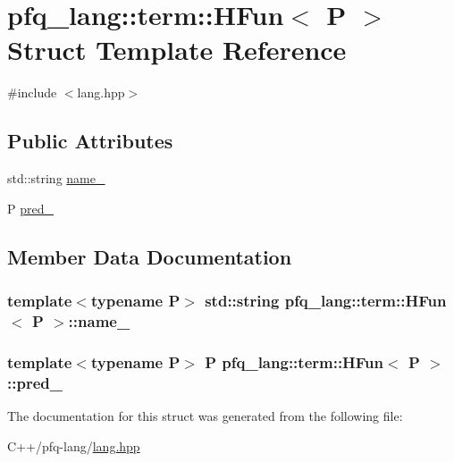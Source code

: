 \hypertarget{structpfq__lang_1_1term_1_1HFun}{\section{pfq\+\_\+lang\+:\+:term\+:\+:H\+Fun$<$ P $>$ Struct Template Reference}
\label{structpfq__lang_1_1term_1_1HFun}
}


{\ttfamily \#include $<$lang.\+hpp$>$}

\subsection*{Public Attributes}
\begin{DoxyCompactItemize}
\item 
std\+::string \hyperlink{structpfq__lang_1_1term_1_1HFun_ae20ef1dda67f36ac1d73bde9eb7ffece}{name\+\_\+}
\item 
P \hyperlink{structpfq__lang_1_1term_1_1HFun_a21b242e11fd7818e6e7c1242433951db}{pred\+\_\+}
\end{DoxyCompactItemize}


\subsection{Member Data Documentation}
\hypertarget{structpfq__lang_1_1term_1_1HFun_ae20ef1dda67f36ac1d73bde9eb7ffece}{
\subsubsection[{name\+\_\+}]{\setlength{\rightskip}{0pt plus 5cm}template$<$typename P$>$ std\+::string {\bf pfq\+\_\+lang\+::term\+::\+H\+Fun}$<$ P $>$\+::name\+\_\+}}\label{structpfq__lang_1_1term_1_1HFun_ae20ef1dda67f36ac1d73bde9eb7ffece}
\hypertarget{structpfq__lang_1_1term_1_1HFun_a21b242e11fd7818e6e7c1242433951db}{
\subsubsection[{pred\+\_\+}]{\setlength{\rightskip}{0pt plus 5cm}template$<$typename P$>$ P {\bf pfq\+\_\+lang\+::term\+::\+H\+Fun}$<$ P $>$\+::pred\+\_\+}}\label{structpfq__lang_1_1term_1_1HFun_a21b242e11fd7818e6e7c1242433951db}


The documentation for this struct was generated from the following file\+:\begin{DoxyCompactItemize}
\item 
C++/pfq-\/lang/\hyperlink{lang_8hpp}{lang.\+hpp}\end{DoxyCompactItemize}
